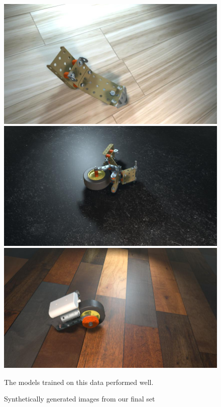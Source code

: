 \begin{figure}
  \includegraphics[width=0.5\columnwidth]{figures/synthetic/floor1.jpg}
  \includegraphics[width=0.5\columnwidth]{figures/synthetic/floor2.jpg}
  \includegraphics[width=0.5\columnwidth]{figures/synthetic/floor3.jpg}
  \begin{captiontext}
    The models trained on this data performed well.
  \end{captiontext}
  \caption{
    Synthetically generated images from our final set
  }\label{fig:good_data}
\end{figure}

